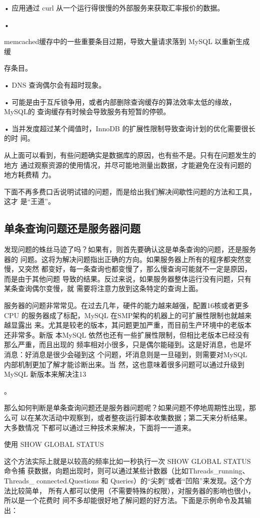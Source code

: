 {• 应用通过 curl 从一个运行得很慢的外部服务来获取汇率报价的数据。

•

memcached缓存中的一些重要条目过期，导致大量请求落到 MySQL 以重新生成缓

存条目。

• DNS 查询偶尔会有超时现象。

• 可能是由于互斥锁争用，或者内部删除查询缓存的算法效率太低的缘故，MySQL的
查询缓存有时候会导致服务有短暂的停顿。

• 当并发度超过某个阈值时，InnoDB 的扩展性限制导致查询计划的优化需要很长的时
间。

从上面可以看到，有些问题确实是数据库的原因，也有些不是。只有在问题发生的地方
通过观察资源的使用情况，并尽可能地测量出数据，才能避免在没有问题的地方耗费精
力。

下面不再多费口舌说明试错的问题，而是给出我们解决间歇性问题的方法和工具，这才
是“王道”。

\subsection{单条查询问题还是服务器问题}
发现问题的蛛丝马迹了吗？如果有，则首先要确认这是单条查询的问题，还是服务器的
问题。这将为解决问题指出正确的方向。如果服务器上所有的程序都突然变慢，又突然
都变好，每一条查询也都变慢了，那么慢查询可能就不一定是原因，而是由于其他问题
导致的结果。反过来说，如果服务器整体运行没有问题，只有某条查询偶尔变慢，就
需要将注意力放到这条特定的查询上面。

服务器的问题非常常见。在过去几年，硬件的能力越来越强，配置16核或者更多 CPU
的服务器成了标配，MySQL 在SMP架构的机器上的可扩展性限制也就越来越显露出
来。尤其是较老的版本，其问题更加严重，而目前生产环境中的老版本还非常多。新版
本MySQL 依然也还有一些扩展性限制，但相比老版本已经没有那么严重，而且出现的
频率相对小很多，只是偶尔能碰到。这是好消息，也是坏消息：好消息是很少会碰到这
个问题，坏消息则是一旦碰到，则需要对MySQL 内部机制更加了解才能诊断出来。当
然，这也意味着很多问题可以通过升级到 MySQL 新版本来解决注13

。

那么如何判断是单条查询问题还是服务器问题呢？如果问题不停地周期性出现，那么可
以在某次活动中观察到，或者整夜运行脚本收集数据；第二天来分析结果。大多数情况
下都可以通过三种技术来解决，下面将一一道来。

使用 SHOW GLOBAL STATUS

这个方法实际上就是以较高的频率比如一秒执行一次 SHOW GLOBAL STATUS命令捕
获数据，向题出现时，则可以通过某些计数器（比如Threads\_running、Threads\_
connected.Questions 和 Queries）的“尖刺”或者“凹陷”来发现。这个方法比较简单，
所有人都可以使用（不需要特殊的权限），对服务器的影响也很小，所以是一个花费时
间不多却能很好地了解问题的好方法。下面是示例命令及其输出：

}
